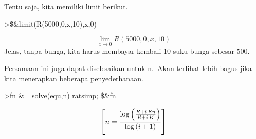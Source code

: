 \documentclass[
]{book}
\begin{document}
Tentu saja, kita memiliki limit berikut.

\textgreater\$\&limit(R(5000,0,x,10),x,0)

\[\lim_{x\rightarrow 0}{R\left(5000 , 0 , x , 10\right)}\]Jelas, tanpa bunga, kita harus membayar kembali 10 suku bunga sebesar 500.

Persamaan ini juga dapat diselesaikan untuk n.~Akan terlihat lebih bagus jika kita menerapkan beberapa penyederhanaan.

\textgreater fn \&= solve(equ,n) \textbar{} ratsimp; \$\&fn

\[\left[ n=\frac{\log \left(\frac{R+i\,{\it Kn}}{R+i\,K}\right)}{\log \left(i+1\right)} \right]\]

\backmatter
\end{document}
